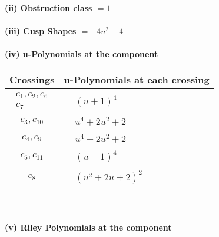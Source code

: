 \documentclass[1p]{elsarticle_modified}
\theoremstyle{definition}
\begin{document}
\flushleft \textbf{(ii) Obstruction class $= 1$}\\~\\
\flushleft \textbf{(iii) Cusp Shapes $= -4 u^2-4$}\\~\\
\newpage\renewcommand{\arraystretch}{1}
\flushleft \textbf{(iv) u-Polynomials at the component}\newline \\
\begin{tabular}{m{50pt}|m{274pt}}
Crossings & \hspace{64pt}u-Polynomials at each crossing \\
\hline $$\begin{aligned}c_{1},c_{2},c_{6}\\c_{7}\end{aligned}$$&$\begin{aligned}
&(u+1)^4
\end{aligned}$\\
\hline $$\begin{aligned}c_{3},c_{10}\end{aligned}$$&$\begin{aligned}
&u^4+2 u^2+2
\end{aligned}$\\
\hline $$\begin{aligned}c_{4},c_{9}\end{aligned}$$&$\begin{aligned}
&u^4-2 u^2+2
\end{aligned}$\\
\hline $$\begin{aligned}c_{5},c_{11}\end{aligned}$$&$\begin{aligned}
&(u-1)^4
\end{aligned}$\\
\hline $$\begin{aligned}c_{8}\end{aligned}$$&$\begin{aligned}
&(u^2+2 u+2)^2
\end{aligned}$\\
\hline
\end{tabular}\\~\\
\newpage\renewcommand{\arraystretch}{1}
\flushleft \textbf{(v) Riley Polynomials at the component}\newline \\
\end{document}

